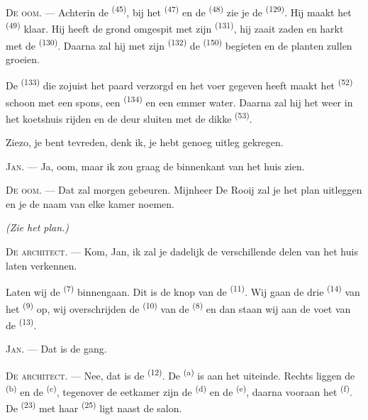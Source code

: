 \textsc{De oom}. --- Achterin de  \textsuperscript{(45)}, bij het
 \textsuperscript{(47)} en de
 \textsuperscript{(48)} zie je de 
\textsuperscript{(129)}. Hij maakt het  \textsuperscript{(49)} klaar. Hij
heeft de grond omgespit met zijn  \textsuperscript{(131)}, hij zaait zaden en
harkt met de  \textsuperscript{(130)}. Daarna zal hij met zijn 
\textsuperscript{(132)} de  \textsuperscript{(150)} begieten en de planten
zullen groeien.

De  \textsuperscript{(133)} die zojuist het paard verzorgd en het voer
gegeven heeft maakt het  \textsuperscript{(52)} schoon met een spons, een
 \textsuperscript{(134)} en een emmer water. Daarna zal hij het weer in het
koetshuis rijden en de deur sluiten met de dikke
 \textsuperscript{(53)}.

Ziezo, je bent tevreden, denk ik, je hebt genoeg uitleg gekregen.

\textsc{Jan}. --- Ja, oom, maar ik zou graag de binnenkant van het huis zien.

\textsc{De oom}. --- Dat zal morgen gebeuren. Mijnheer De Rooij zal je het plan uitleggen en
je de naam van elke kamer noemen.

\VUsaut{3.0mm}
\VUsaut{2.4mm}

{\centering\textit{(Zie het plan.)}\par}
\VUsaut{2.4mm}

\textsc{De architect}. --- Kom, Jan, ik zal je dadelijk de verschillende delen van het huis
laten verkennen.

Laten wij de  \textsuperscript{(7)} binnengaan. Dit is de knop van de
 \textsuperscript{(11)}. Wij gaan de drie
 \textsuperscript{(14)} van het 
\textsuperscript{(9)} op, wij overschrijden de  \textsuperscript{(10)} van de
 \textsuperscript{(8)} en dan staan wij aan de voet van de 
\textsuperscript{(13)}.

\textsc{Jan}. --- Dat is de gang.

\textsc{De architect}. --- Nee, dat is de  \textsuperscript{(12)}. De
 \textsuperscript{(a)} is aan het uiteinde. Rechts liggen de 
\textsuperscript{(b)} en de
 \textsuperscript{(c)}, tegenover de eetkamer zijn de
 \textsuperscript{(d)} en de 
\textsuperscript{(e)}, daarna vooraan het  \textsuperscript{(f)}. De
 \textsuperscript{(23)} met haar
 \textsuperscript{(25)} ligt naast de salon.

